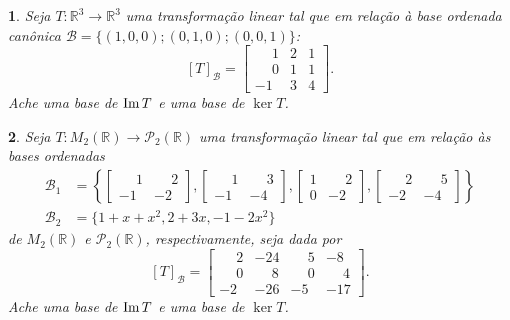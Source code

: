 \documentclass[12pt]{exam}
\newtheorem{exercicio}{}
\newcommand{\im}{{\rm Im\,}}
\newcommand{\real}{\mathbb{R}}
\begin{document}
\begin{exercicio}
  Seja $T : \real^3 \to \real^3$ uma transforma\c{c}\~ao linear tal que em rela\c{c}\~ao \`a base ordenada can\^onica $\mathcal{B} = \{(1,0,0); (0,1,0); (0,0,1)\}$:
  \[
    [T]_\mathcal{B} =\begin{bmatrix}
      \phantom{-}1 & 2 & 1\\
      \phantom{-} 0 & 1 & 1\\
      -1 & 3 & 4
    \end{bmatrix}.
  \]
  Ache uma base de $\im T$ e uma base de $\ker T$.
\end{exercicio}

\begin{exercicio}
  Seja $T : M_2(\real) \to \mathcal{P}_2(\real)$ uma transforma\c{c}\~ao linear tal que em rela\c{c}\~ao \`as bases ordenadas
  \begin{align*}
    \mathcal{B}_1 &= \left\{\begin{bmatrix}
      \phantom{-}1 & \phantom{-}2\\-1 & -2
    \end{bmatrix}, \begin{bmatrix}
      \phantom{-}1 & \phantom{-}3\\-1 & -4
    \end{bmatrix}, \begin{bmatrix}
      1 & \phantom{-}2\\0 & -2
    \end{bmatrix}, \begin{bmatrix}
      \phantom{-}2 & \phantom{-}5\\-2 & -4
    \end{bmatrix}\right\}\\
    \mathcal{B}_2 &= \{1 + x + x^2, 2 + 3x, -1 - 2x^2\}
  \end{align*}
  de $M_2(\real)$ e $\mathcal{P}_2(\real)$, respectivamente, seja dada por
  \[
    [T]_\mathcal{B} =\begin{bmatrix}
      \phantom{-}2 & -24 & \phantom{-}5 & -8\\
      \phantom{-}0 & \phantom{-}8 & \phantom{-}0 & \phantom{-}4\\
      -2 & -26 & -5 & -17
    \end{bmatrix}.
  \]
  Ache uma base de $\im T$ e uma base de $\ker T$.
\end{exercicio}
\end{document}
